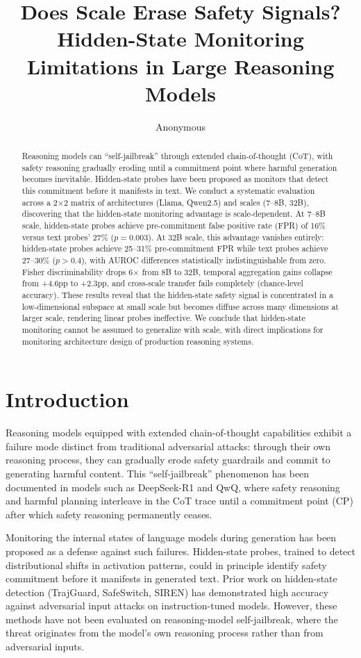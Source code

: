 \documentclass[11pt]{article}
\title{Does Scale Erase Safety Signals? Hidden-State Monitoring Limitations in Large Reasoning Models}
\author{Anonymous}
\date{}
\begin{document}
\maketitle

\begin{abstract}
Reasoning models can ``self-jailbreak'' through extended chain-of-thought (CoT), with safety reasoning gradually eroding until a commitment point where harmful generation becomes inevitable. Hidden-state probes have been proposed as monitors that detect this commitment before it manifests in text. We conduct a systematic evaluation across a 2$\times$2 matrix of architectures (Llama, Qwen2.5) and scales (7--8B, 32B), discovering that the hidden-state monitoring advantage is scale-dependent. At 7--8B scale, hidden-state probes achieve pre-commitment false positive rate (FPR) of 16\% versus text probes' 27\% ($p{=}0.003$). At 32B scale, this advantage vanishes entirely: hidden-state probes achieve 25--31\% pre-commitment FPR while text probes achieve 27--30\% ($p{>}0.4$), with AUROC differences statistically indistinguishable from zero. Fisher discriminability drops 6$\times$ from 8B to 32B, temporal aggregation gains collapse from +4.6pp to +2.3pp, and cross-scale transfer fails completely (chance-level accuracy). These results reveal that the hidden-state safety signal is concentrated in a low-dimensional subspace at small scale but becomes diffuse across many dimensions at larger scale, rendering linear probes ineffective. We conclude that hidden-state monitoring cannot be assumed to generalize with scale, with direct implications for monitoring architecture design of production reasoning systems.
\end{abstract}

\section{Introduction}

Reasoning models equipped with extended chain-of-thought capabilities exhibit a failure mode distinct from traditional adversarial attacks: through their own reasoning process, they can gradually erode safety guardrails and commit to generating harmful content. This ``self-jailbreak'' phenomenon has been documented in models such as DeepSeek-R1 and QwQ, where safety reasoning and harmful planning interleave in the CoT trace until a commitment point (CP) after which safety reasoning permanently ceases.

Monitoring the internal states of language models during generation has been proposed as a defense against such failures. Hidden-state probes, trained to detect distributional shifts in activation patterns, could in principle identify safety commitment before it manifests in generated text. Prior work on hidden-state detection (TrajGuard, SafeSwitch, SIREN) has demonstrated high accuracy against adversarial input attacks on instruction-tuned models. However, these methods have not been evaluated on reasoning-model self-jailbreak, where the threat originates from the model's own reasoning process rather than from adversarial inputs.
\end{document}
